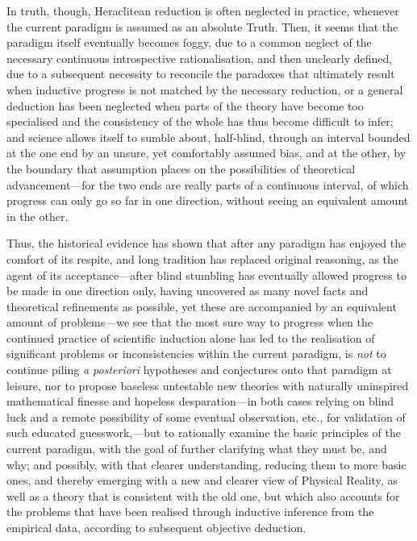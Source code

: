 In truth, though, Heraclitean reduction is often neglected in practice, whenever the current paradigm is assumed as an absolute Truth. Then, it seems that the paradigm itself eventually becomes foggy, due to a common neglect of the necessary continuous introspective rationalisation, and then unclearly defined, due to a subsequent necessity to reconcile the paradoxes that ultimately result when inductive progress is not matched by the necessary reduction, or a general deduction has been neglected when parts of the theory have become too specialised and the consistency of the whole has thus become difficult to infer; and science allows itself to sumble about, half-blind, through an interval bounded at the one end by an unsure, yet comfortably assumed bias, and at the other, by the boundary that assumption places on the possibilities of theoretical advancement---for the two ends are really parts of a continuous interval, of which progress can only go so far in one direction, without seeing an equivalent amount in the other. 

Thus, the historical evidence has shown that after any paradigm has enjoyed the comfort of its respite, and long tradition has replaced original reasoning, as the agent of its acceptance---after blind stumbling has eventually allowed progress to be made in one direction only, having uncovered as many novel facts and theoretical refinements as possible, yet these are accompanied by an equivalent amount of problems---we see that the most sure way to progress when the continued practice of scientific induction alone has led to the realisation of significant problems or inconsistencies within the current paradigm, is \textit{not} to continue piling \textit{a posteriori} hypotheses and conjectures onto that paradigm at leisure, nor to propose baseless untestable new theories with naturally uninspired mathematical finesse and hopeless desparation---in both cases relying on blind luck and a remote possibility of some eventual observation, etc., for validation of such educated guesswork,---but to rationally examine the basic principles of the current paradigm, with the goal of further clarifying what they must be, and why; and possibly, with that clearer understanding, reducing them to more basic ones, and thereby emerging with a new and clearer view of Physical Reality, as well as a theory that is consistent with the old one, but which also accounts for the problems that have been realised through inductive inference from the empirical data, according to subsequent objective deduction.

